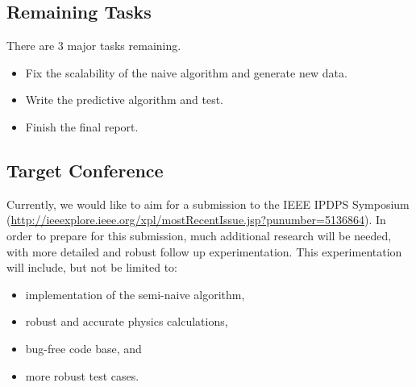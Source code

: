 \documentclass[conference]{IEEEtran}
\begin{document}
\subsection{Remaining Tasks}
There are 3 major tasks remaining.
\begin{itemize}
\item Fix the scalability of the naive algorithm and generate new data.
\item Write the predictive algorithm and test.
\item Finish the final report.
\end{itemize}

\subsection{Target Conference}
Currently, we would like to aim for a submission to the IEEE IPDPS Symposium (\url{http://ieeexplore.ieee.org/xpl/mostRecentIssue.jsp?punumber=5136864}).  In order to prepare for this submission, much additional research will be needed, with more detailed and robust follow up experimentation.  This experimentation will include, but not be limited to:
\begin{itemize}
\item implementation of the semi-naive algorithm,
\item robust and accurate physics calculations,
\item bug-free code base, and
\item more robust test cases.
\end{itemize}

%
%
\end{document}
